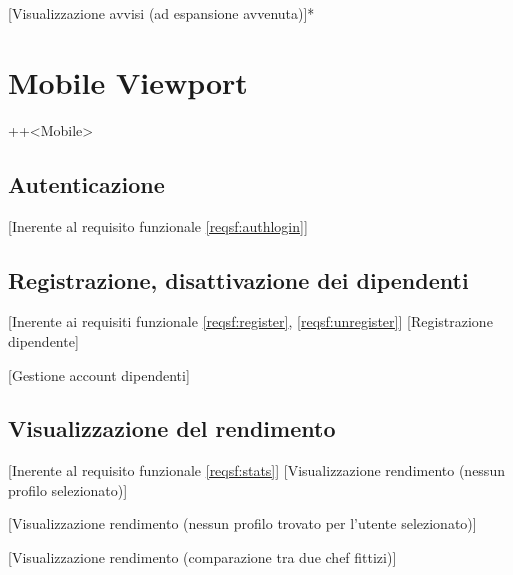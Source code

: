 	[Visualizzazione avvisi (ad espansione avvenuta)]*

\section*{Mobile Viewport}+\Materialpanoramavertical+<Mobile>
\subsection{Autenticazione}[Inerente al requisito funzionale \ref{reqsf:authlogin}]


\subsection{Registrazione, disattivazione dei dipendenti}[Inerente ai requisiti funzionale \ref{reqsf:register}, \ref{reqsf:unregister}]
	[Registrazione dipendente]

	[Gestione account dipendenti]

\subsection{Visualizzazione del rendimento}[Inerente al requisito funzionale \ref{reqsf:stats}]
	[Visualizzazione rendimento (nessun profilo selezionato)]

	[Visualizzazione rendimento (nessun profilo trovato per l'utente selezionato)]

	[Visualizzazione rendimento (comparazione tra due chef fittizi)]

